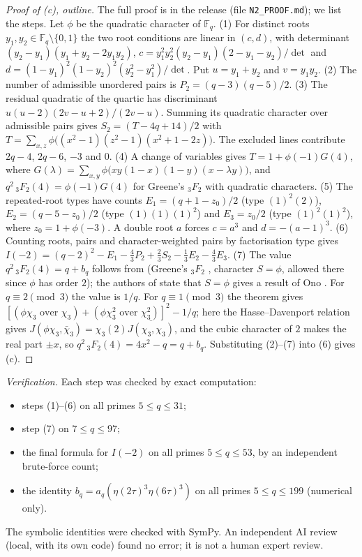 \documentclass[11pt]{article}
\begin{document}
\begin{proof}[Proof of (c), outline]
The full proof is in the release (file \texttt{N2\_PROOF.md}); we list the steps. Let $\phi$ be the quadratic character of $\mathbb F_q$.
(1) For distinct roots $y_1,y_2\in\mathbb F_q\setminus\{0,1\}$ the two root conditions are linear in $(c,d)$, with determinant
$(y_2-y_1)(y_1+y_2-2y_1y_2)$, $c=y_1^2y_2^2(y_2-y_1)(2-y_1-y_2)/\det$ and $d=(1-y_1)^2(1-y_2)^2(y_2^2-y_1^2)/\det$.
Put $u=y_1+y_2$ and $v=y_1y_2$.
(2) The number of admissible unordered pairs is $P_2=(q-3)(q-5)/2$.
(3) The residual quadratic of the quartic has discriminant $u(u-2)(2v-u+2)/(2v-u)$. Summing its quadratic character over admissible pairs gives
$S_2=(T-4q+14)/2$ with $T=\sum_{x,z}\phi\big((x^2-1)(z^2-1)(x^2+1-2z)\big)$. The excluded lines contribute $2q-4$, $2q-6$, $-3$ and $0$.
(4) A change of variables gives $T=1+\phi(-1)G(4)$, where $G(\lambda)=\sum_{x,y}\phi\big(xy(1-x)(1-y)(x-\lambda y)\big)$, and $q^2\,{}_3F_2(4)=\phi(-1)G(4)$
for Greene's ${}_3F_2$ with quadratic characters.
(5) The repeated-root types have counts $E_1=(q+1-z_0)/2$ (type $(1)^2(2)$), $E_2=(q-5-z_0)/2$ (type $(1)(1)(1)^2$) and $E_3=z_0/2$ (type $(1)^2(1)^2$), where $z_0=1+\phi(-3)$. A double root $a$ forces $c=a^3$ and $d=-(a-1)^3$.
(6) Counting roots, pairs and character-weighted pairs by factorisation type gives
$I(-2)=(q-2)^2-E_1-\tfrac43P_2+\tfrac23S_2-\tfrac13E_2-\tfrac43E_3$.
(7) The value $q^2\,{}_3F_2(4)=q+b_q$ follows from \cite[Thm.~1.7]{BK} (Greene's ${}_3F_2$ \cite{Gre}, character $S=\phi$, allowed there since $\phi$ has order $2$); the authors of \cite{BK}
state that $S=\phi$ gives a result of Ono \cite{On}. For $q\equiv2\pmod 3$ the value is $1/q$.
For $q\equiv1\pmod3$ the theorem gives $[(\phi\chi_3\text{ over }\chi_3)+(\phi\chi_3^2\text{ over }\chi_3^2)]^2-1/q$; here the Hasse--Davenport relation \cite{IR} gives
$J(\phi\chi_3,\bar\chi_3)=\chi_3(2)\overline{J(\chi_3,\chi_3)}$, and the cubic character of $2$ \cite{IR} makes the real part $\pm x$, so $q^2\,{}_3F_2(4)=4x^2-q=q+b_q$.
Substituting (2)--(7) into (6) gives (c).
\end{proof}

\emph{Verification.} Each step was checked by exact computation:
\begin{itemize}
\item steps (1)--(6) on all primes $5\le q\le31$;
\item step (7) on $7\le q\le97$;
\item the final formula for $I(-2)$ on all primes $5\le q\le53$, by an independent brute-force count;
\item the identity $b_q=a_q(\eta(2\tau)^3\eta(6\tau)^3)$ on all primes $5\le q\le199$ (numerical only).
\end{itemize}
The symbolic identities were checked with SymPy. An independent AI review (local, with its own code) found no error; it is not a human expert review.
\end{document}
